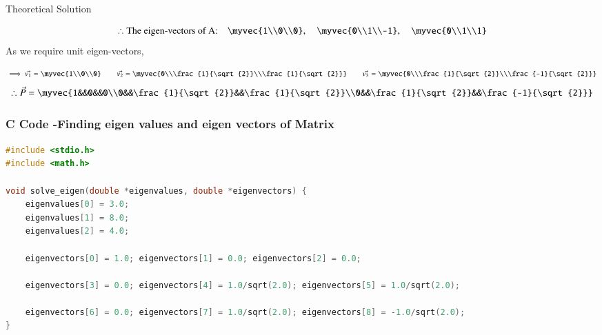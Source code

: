 \documentclass{beamer}
\begin{document}
\begin{frame}{Theoretical Solution}

\begin{align}
    \therefore \text{The eigen-vectors of A:}\quad \myvec{1\\0\\0},\quad \myvec{0\\1\\-1},\quad \myvec{0\\1\\1}
\end{align}
As we require unit eigen-vectors,

\begin{align}
    \implies \vec{v_1}=\myvec{1\\0\\0} \qquad \vec{v_2}=\myvec{0\\\frac{1}{\sqrt{2}}\\\frac{1}{\sqrt{2}}} \qquad \vec{v_3}=\myvec{0\\\frac{1}{\sqrt{2}}\\\frac{-1}{\sqrt{2}}}
\end{align}
\begin{align}
    \therefore \vec{P}=\myvec{1&&0&&0\\0&&\frac{1}{\sqrt{2}}&&\frac{1}{\sqrt{2}}\\0&&\frac{1}{\sqrt{2}}&&\frac{-1}{\sqrt{2}}}
\end{align}
\end{frame}

\begin{frame}[fragile]
    \frametitle{C Code -Finding eigen values and eigen vectors of Matrix}

    \begin{lstlisting}[language=C]
#include <stdio.h>
#include <math.h>

void solve_eigen(double *eigenvalues, double *eigenvectors) {
    eigenvalues[0] = 3.0;
    eigenvalues[1] = 8.0;
    eigenvalues[2] = 4.0;

    eigenvectors[0] = 1.0; eigenvectors[1] = 0.0; eigenvectors[2] = 0.0;

    eigenvectors[3] = 0.0; eigenvectors[4] = 1.0/sqrt(2.0); eigenvectors[5] = 1.0/sqrt(2.0);

    eigenvectors[6] = 0.0; eigenvectors[7] = 1.0/sqrt(2.0); eigenvectors[8] = -1.0/sqrt(2.0);
}


    \end{lstlisting}
\end{frame}
\end{document}
